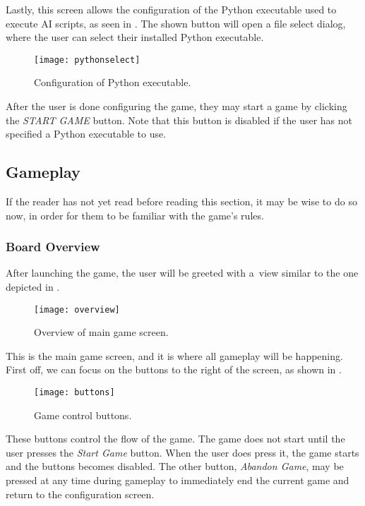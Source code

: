 Lastly, this screen allows the configuration of the Python executable used
to execute AI scripts, as seen in . The shown
button will open a file select dialog, where the user can select their
installed Python executable.

\begin{figure}[ht]
\centerline{\mbox{\texttt{[image: pythonselect]}}}
\caption{Configuration of Python executable.}\label{ud:pythonselect}
\end{figure}

After the user is done configuring the game, they may start a game by clicking the
\emph{START GAME} button. Note that this button is disabled if the user
has not specified a Python executable to use.

\subsection{Gameplay}

If the reader has not yet read  before reading this section,
it may be wise to do so now, in order for them to be familiar with
the game's rules.

\subsubsection{Board Overview}

After launching the game, the user will be greeted with a~view similar to
the one depicted in .

\begin{figure}[ht]
\centerline{\mbox{\texttt{[image: overview]}}}
\caption{Overview of main game screen.}\label{ud:overview}
\end{figure}

This is the main game screen, and it is where all gameplay will be happening.
First off, we can focus on the buttons to the right of the screen, as shown in
.

\begin{figure}[ht]
\centerline{\mbox{\texttt{[image: buttons]}}}
\caption{Game control buttons.}\label{ud:buttons}
\end{figure}

These buttons control the flow of the game. The game does not start until the user
presses the \emph{Start Game} button. When the user does press it, the game starts
and the buttons becomes disabled. The other button, \emph{Abandon Game}, may be
pressed at any time during gameplay to immediately end the current game and return
to the configuration screen.

